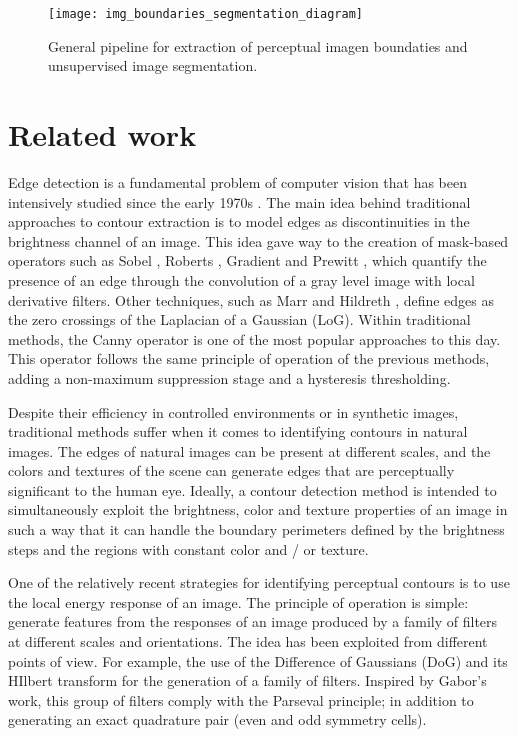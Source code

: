 \begin{figure}[!ht]
	\centering
	\texttt{[image: img\_boundaries\_segmentation\_diagram]}
	\caption{General pipeline for extraction of perceptual imagen boundaties and unsupervised image segmentation.}\label{fig:pipeline_gabor_image_segmentation}
\end{figure}

\section{Related work}
Edge detection is a fundamental problem of computer vision that has been intensively studied since the early 1970s \citep{Hueckel:JACM:1971, Fram.Deutsch:TC:1975}. The main idea behind traditional approaches to contour extraction is to model edges as discontinuities in the brightness channel of an image. This idea gave way to the creation of mask-based operators such as Sobel \citep{Maitre:Book:2003}, Roberts \citep{Roberts:Thesis:1963}, Gradient \citep{Maitre:Book:2003} and Prewitt \citep{Prewitt:PPP:1970}, which quantify the presence of an edge through the convolution of a gray level image with local derivative filters. Other techniques, such as Marr and Hildreth \citep{Marr.Hildreth:PRS:1980}, define edges as the zero crossings of the Laplacian of a Gaussian (LoG). Within traditional methods, the Canny \citep{Canny:PAMI:1986} operator is one of the most popular approaches to this day. This operator follows the same principle of operation of the previous methods, adding a non-maximum suppression stage and a hysteresis thresholding.

Despite their efficiency in controlled environments or in synthetic images, traditional methods suffer when it comes to identifying contours in natural images. The edges of natural images can be present at different scales, and the colors and textures of the scene can generate edges that are perceptually significant to the human eye. Ideally, a contour detection method is intended to simultaneously exploit the brightness, color and texture properties of an image in such a way that it can handle the boundary perimeters defined by the brightness steps and the regions with constant color and / or texture.

One of the relatively recent strategies for identifying perceptual contours is to use the local energy response of an image. The principle of operation is simple: generate features from the responses of an image produced by a family of filters at different scales and orientations. The idea has been exploited from different points of view. For example, the use of the  Difference of Gaussians (DoG) and its HIlbert transform \citep{Morrone.Owens:PR:1987, Morrone.Burr.ea:RSL:1988} for the generation of a family of filters. Inspired by Gabor's work, this group of filters comply with the Parseval principle; in addition to generating an exact quadrature pair (even and odd symmetry cells).

